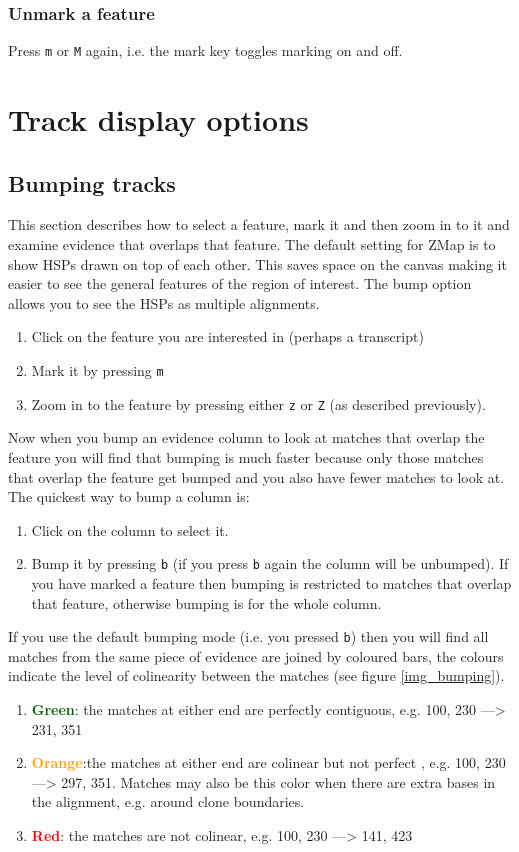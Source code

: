 \documentclass[letterpaper]{article}
\begin{document}
\subsubsection{Unmark a feature}
Press \lstinline{m} or \lstinline{M} again, i.e. the mark key toggles marking on and off.


\clearpage
\section{Track display options}

\subsection{Bumping tracks}
This section describes how to select a feature, mark it and then zoom in to it and examine evidence that overlaps that feature. The default setting for ZMap is to show HSPs drawn on top of each other. This saves space on the canvas making it easier to see the general features of the region of interest. The bump option allows you to see the HSPs as multiple alignments.
\begin{enumerate}
\item Click on the feature you are interested in (perhaps a transcript)
\item Mark it by pressing \lstinline{m}
\item Zoom in to the feature by pressing either \lstinline{z} or \lstinline{Z} (as described previously).
\end{enumerate}

Now when you bump an evidence column to look at matches that overlap the feature you will find that bumping is much faster because only those matches that overlap the feature get bumped and you also have fewer matches to look at. The quickest way to bump a column is:
\begin{enumerate}
\item Click on the column to select it.
\item Bump it by pressing \lstinline{b} (if you press \lstinline{b} again the column will be unbumped). If you have marked a feature then bumping is restricted to matches that overlap that feature, otherwise bumping is for the whole column.
\end{enumerate}

If you use the default bumping mode (i.e. you pressed \lstinline{b}) then you will find all matches from the same piece of evidence are joined by coloured bars, the colours indicate the level of colinearity between the matches (see figure \ref{img_bumping}).
\begin{enumerate}
\item \textcolor{darkgreen}{\textbf{Green}}: the matches at either end are perfectly contiguous, e.g. 100, 230 ---> 231, 351
\item \textcolor{orange}{\textbf{Orange}}:the matches at either end are colinear but not perfect , e.g. 100, 230 ---> 297, 351. Matches may also be this color when there are extra bases in the alignment, e.g. around clone boundaries.
\item \textcolor{red}{\textbf{Red}}: the matches are not colinear, e.g. 100, 230 ---> 141, 423
\end{enumerate}
\end{document}
